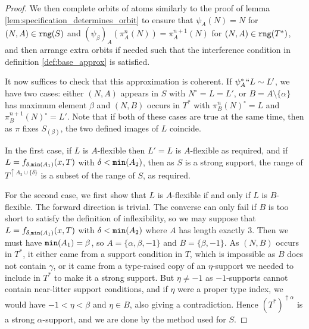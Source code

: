 \documentclass[112pt]{article}
\theoremstyle{definition}
\theoremstyle{remark}
\newcommand{\rk}[1]{{\color{blue}\sl #1}}
\begin{document}
\begin{proof}
We then complete orbits of atoms similarly to the proof of lemma \ref{lem:specification_determines_orbit} to ensure that $\psi_A(N) = N$ for $(N,A) \in {\tt rng}(S)$ and $(\psi_\beta)_A(\pi^n_A(N)) = \pi^{n+1}_A(N)$ for $(N,A) \in {\tt rng}(T^*)$, and then arrange extra orbits if needed such that the interference condition in definition \ref{def:base_approx} is satisfied.

{
It now suffices to check that this approximation is coherent.
If $\psi_A^*``L \sim L'$, we have two cases: either $(N,A)$ appears in $S$ with $N^\circ = L = L'$, or $B = A\setminus\{\alpha\}$ has maximum element $\beta$ and $(N,B)$ occurs in $T^*$ with $\pi_B^n(N)^\circ = L$ and $\pi_B^{n+1}(N)^\circ = L'$.
Note that if both of these cases are true at the same time, then as $\pi$ fixes $S_{(\beta)}$, the two defined images of $L$ coincide.

In the first case, if $L$ is $A$-flexible then $L' = L$ is $A$-flexible as required, and if $L = f_{\delta,{\tt min}(A_1)}(x,T)$ with $\delta < {\tt min}(A_2)$, then as $S$ is a strong support, the range of $T^{\uparrow A_2 \cup \{\delta\}}$ is a subset of the range of $S$, as required.

For the second case, we first show that $L$ is $A$-flexible if and only if $L$ is $B$-flexible.
The forward direction is trivial.
The converse can only fail if $B$ is too short to satisfy the definition of inflexibility, so we may suppose that $L = f_{\delta,{\tt min}(A_1)}(x,T)$ with $\delta < {\tt min}(A_2)$ where $A$ has length exactly 3.
Then we must have ${\tt min}(A_1) = \beta$, so $A = \{\alpha,\beta,-1\}$ and $B = \{\beta,-1\}$.
As $(N,B)$ occurs in $T^*$, it either came from a support condition in $T$, which is impossible as $B$ does not contain $\gamma$, or it came from a type-raised copy of an $\eta$-support we needed to include in $T^*$ to make it a strong support.
But $\eta \neq -1$ as $-1$-supports cannot contain near-litter support conditions, and if $\eta$ were a proper type index, we would have $-1 < \eta < \beta$ and $\eta \in B$, also giving a contradiction.
Hence $(T^*)^{\uparrow\alpha}$ is a strong $\alpha$-support, and we are done by the method used for $S$.
}

\begin{comment}
Close up the $\gamma$-support $T$ to a support $T^*$ under action of $\pi$ (for each $(x,A)$ in the range of $T^*$ and each integer $i$, $((\pi^i)^+_A``x,A) \in {\tt rng}(T^*)$) and values at exceptions
(if $(x,A) \in {\tt rng}(T^*)$ and $y \in x \Delta x^\circ$, then $(\{y\},A) \in {\tt rng}(T^*)$; in combination with closure under actions of $\pi$, this handles all exceptional actions).  That $T$ can be extended to a support with these properties should be clear.


\end{comment}
\end{proof}
\end{document}
